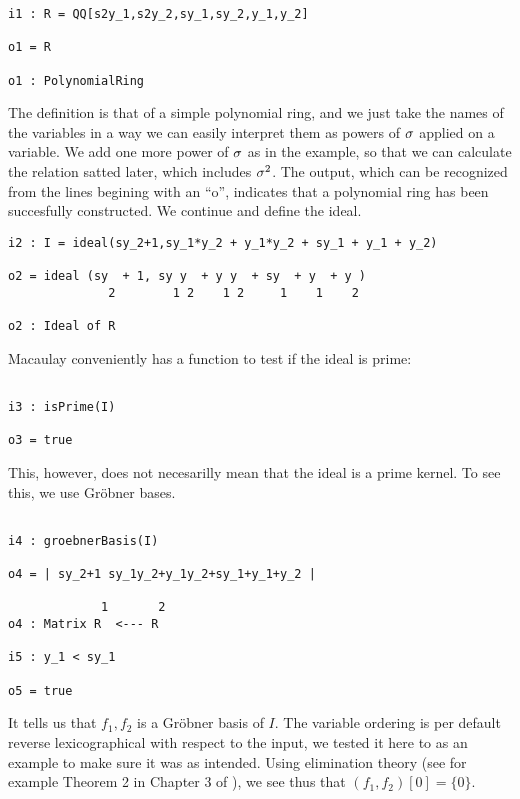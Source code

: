 \begin{lstlisting}
i1 : R = QQ[s2y_1,s2y_2,sy_1,sy_2,y_1,y_2]

o1 = R

o1 : PolynomialRing

\end{lstlisting}

The definition is that of a simple polynomial ring, and we just take the names of the variables in a way we can easily interpret them as powers of $\sigma$ applied on a variable. We add one more power of $\sigma$ as in the example, so that we can calculate the relation satted later, which includes $\sigma^2$.
The output, which can be recognized from the lines begining with an ``o'', indicates that a polynomial ring has been succesfully constructed. We continue and define the ideal.

\begin{lstlisting}
i2 : I = ideal(sy_2+1,sy_1*y_2 + y_1*y_2 + sy_1 + y_1 + y_2)

o2 = ideal (sy  + 1, sy y  + y y  + sy  + y  + y )
              2        1 2    1 2     1    1    2

o2 : Ideal of R

\end{lstlisting}

Macaulay conveniently has a function to test if the ideal is prime: 

\begin{lstlisting}

i3 : isPrime(I)

o3 = true

\end{lstlisting}

This, however, does not necesarilly mean that the ideal is a prime kernel. To see this, we use Gr\"{o}bner bases.

\begin{lstlisting}

i4 : groebnerBasis(I)

o4 = | sy_2+1 sy_1y_2+y_1y_2+sy_1+y_1+y_2 |

             1       2
o4 : Matrix R  <--- R

i5 : y_1 < sy_1

o5 = true

\end{lstlisting}

It tells us that $f_1, f_2$ is a Gr\"{o}bner basis of $I$.
The variable ordering is per default reverse lexicographical with respect to the input, 
we tested it here to as an example to make sure it was as intended.
Using elimination theory (see for example Theorem 2 in Chapter 3 of \cite{cox}),
we see thus that $(f_1,f_2)[0] = \{0\}$.

